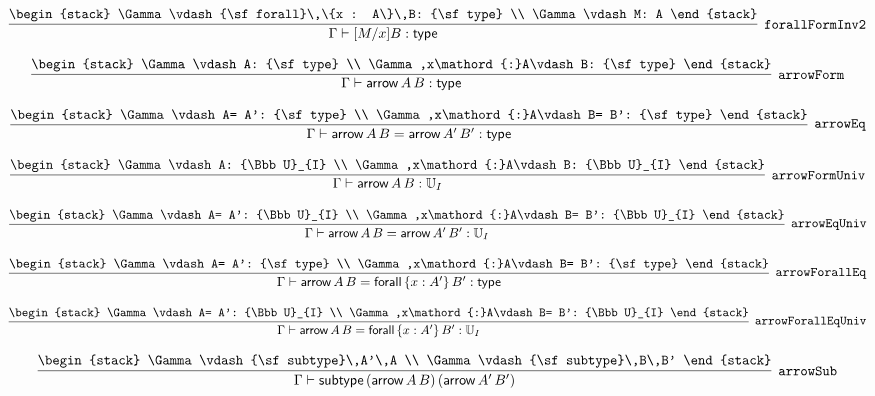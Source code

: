 \[
\infer[{\tt forallFormInv2}]{\Gamma \vdash [M/x]B: {\sf type}}{
\begin{stack}
\Gamma \vdash {\sf forall}\,\{x : A\}\,B: {\sf type}
\\
\Gamma \vdash M: A
\end{stack}}
\]

\[
\infer[{\tt arrowForm}]{\Gamma \vdash {\sf arrow}\,A\,B: {\sf type}}{
\begin{stack}
\Gamma \vdash A: {\sf type}
\\
\Gamma ,x\mathord{:}A\vdash B: {\sf type}
\end{stack}}
\]

\[
\infer[{\tt arrowEq}]{\Gamma \vdash {\sf arrow}\,A\,B= {\sf arrow}\,A'\,B': {\sf type}}{
\begin{stack}
\Gamma \vdash A= A': {\sf type}
\\
\Gamma ,x\mathord{:}A\vdash B= B': {\sf type}
\end{stack}}
\]

\[
\infer[{\tt arrowFormUniv}]{\Gamma \vdash {\sf arrow}\,A\,B: {\Bbb U}_{I}}{
\begin{stack}
\Gamma \vdash A: {\Bbb U}_{I}
\\
\Gamma ,x\mathord{:}A\vdash B: {\Bbb U}_{I}
\end{stack}}
\]

\[
\infer[{\tt arrowEqUniv}]{\Gamma \vdash {\sf arrow}\,A\,B= {\sf arrow}\,A'\,B': {\Bbb U}_{I}}{
\begin{stack}
\Gamma \vdash A= A': {\Bbb U}_{I}
\\
\Gamma ,x\mathord{:}A\vdash B= B': {\Bbb U}_{I}
\end{stack}}
\]

\[
\infer[{\tt arrowForallEq}]{\Gamma \vdash {\sf arrow}\,A\,B= {\sf forall}\,\{x : A'\}\,B': {\sf type}}{
\begin{stack}
\Gamma \vdash A= A': {\sf type}
\\
\Gamma ,x\mathord{:}A\vdash B= B': {\sf type}
\end{stack}}
\]

\[
\infer[{\tt arrowForallEqUniv}]{\Gamma \vdash {\sf arrow}\,A\,B= {\sf forall}\,\{x : A'\}\,B': {\Bbb U}_{I}}{
\begin{stack}
\Gamma \vdash A= A': {\Bbb U}_{I}
\\
\Gamma ,x\mathord{:}A\vdash B= B': {\Bbb U}_{I}
\end{stack}}
\]

\[
\infer[{\tt arrowSub}]{\Gamma \vdash {\sf subtype}\,({\sf arrow}\,A\,B)\,({\sf arrow}\,A'\,B')}{
\begin{stack}
\Gamma \vdash {\sf subtype}\,A'\,A
\\
\Gamma \vdash {\sf subtype}\,B\,B'
\end{stack}}
\]

